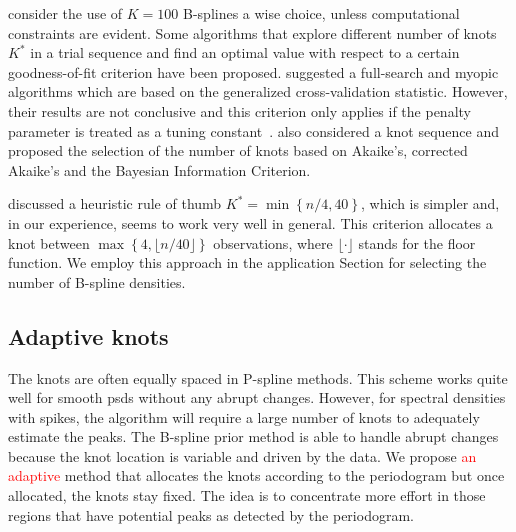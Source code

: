 \documentclass[twocolumn,final]{svjour3}
\begin{document}
\cite{Eilers2015} consider the use of $K=100$ B-splines a wise choice, unless computational constraints are evident.  Some algorithms that explore different number of knots $K^*$ in a trial sequence and find an optimal value with respect to a certain goodness-of-fit criterion have been proposed. \cite{Ruppert2002} suggested a full-search and myopic algorithms which are based on the generalized cross-validation statistic.  However, their results are not conclusive and this criterion only applies if the penalty parameter is treated as a tuning constant~\citep{Kauermann2011}.  \cite{Likhachev2017} also considered a knot sequence and proposed the selection of the number of knots based on  Akaike's, corrected Akaike's and
the Bayesian Information Criterion.

\cite{Ruppert2002} discussed a heuristic rule of thumb $K^* = \min\left\{n/4, 40\right\}$, which is simpler and, in our experience, seems to work very well in general.  This criterion allocates a knot between $\max\left\{ 4, \lfloor n/40 \rfloor \right\}$ observations, where $\lfloor \cdot \rfloor$ stands for the floor function.  We employ this approach in the application Section for selecting the number of B-spline densities.


\subsection*{Adaptive knots}

The knots are often equally spaced in P-spline methods.  This scheme works quite well  for smooth psds without any abrupt changes.  However, for spectral densities with spikes, the algorithm will require a large number of knots to adequately estimate the peaks.  The B-spline prior method is able to handle abrupt changes because the knot location is variable and  driven by the data.  We propose \textcolor{red}{an adaptive} method that allocates the knots according to the periodogram but once allocated, the knots stay fixed.  The idea is to concentrate more effort in those regions that have potential peaks as detected by the periodogram.  
\end{document}
